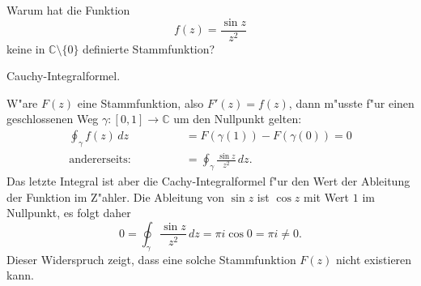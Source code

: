 Warum hat die Funktion
\[
f(z)=\frac{\sin z}{z^2}
\]
keine in $\mathbb C\setminus\{0\}$ definierte Stammfunktion?
%

\begin{hinweis}
Cauchy-Integralformel.
%
\end{hinweis}

\begin{loesung}
W"are $F(z)$ eine Stammfunktion, also $F'(z)=f(z)$,
dann m"usste f"ur einen geschlossenen
Weg $\gamma:[0,1]\to\mathbb C$ um den Nullpunkt gelten:
\begin{align*}
\oint_\gamma f(z)\,dz&=F(\gamma(1))-F(\gamma(0))=0
\\
\text{andererseits:}\qquad\qquad
&=
\oint_\gamma \frac{\sin z}{z^2}\,dz.
\end{align*}
Das letzte Integral ist aber die Cachy-Integralformel f"ur den Wert
der Ableitung der Funktion im Z"ahler. 
Die Ableitung von $\sin z$ ist $\cos z$ mit Wert $1$ im Nullpunkt,
es folgt daher
\[
0 = \oint_\gamma \frac{\sin z}{z^2}\,dz = \pi i \cos 0=\pi i\ne 0.
\]
Dieser Widerspruch zeigt, dass eine solche Stammfunktion $F(z)$ nicht
existieren kann.
\end{loesung}

